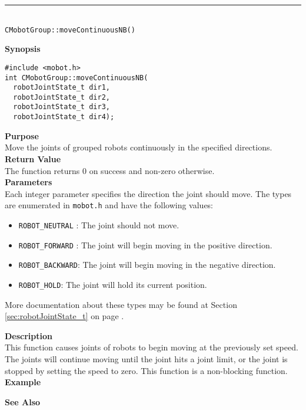 \noindent
\vspace{5pt}
\rule{4.5in}{0.015in}\\
\noindent
{\LARGE \texttt{CMobotGroup::moveContinuousNB()}}\\
{}

\noindent
{\bf Synopsis}
\vspace{-8pt}
\begin{verbatim}
#include <mobot.h>
int CMobotGroup::moveContinuousNB(
  robotJointState_t dir1, 
  robotJointState_t dir2, 
  robotJointState_t dir3, 
  robotJointState_t dir4);
\end{verbatim}

\noindent
{\bf Purpose}\\
Move the joints of grouped robots continuously in the specified directions.\\

\noindent
{\bf Return Value}\\
The function returns 0 on success and non-zero otherwise.\\

\noindent
{\bf Parameters}\\
Each integer parameter specifies the direction the joint should move. The types
are enumerated in \texttt{mobot.h} and have the following values:
\begin{itemize}
\item \texttt{ROBOT\_NEUTRAL} : The joint should not move.
\item \texttt{ROBOT\_FORWARD} : The joint will begin moving in the positive direction.
\item \texttt{ROBOT\_BACKWARD}: The joint will begin moving in the negative direction.
\item \texttt{ROBOT\_HOLD}: The joint will hold its current position.
\end{itemize}
More documentation about these types may be found at Section
\ref{sec:robotJointState_t} on page
\pageref{sec:robotJointState_t}.

\noindent
{\bf Description}\\
This function causes joints of robots to begin moving at the previously set
speed. The joints will continue moving until the joint hits a joint limit, or
the joint is stopped by setting the speed to zero. This function is a non-blocking
function.\\

\noindent
{\bf Example}\\
\noindent

\noindent
{\bf See Also}\\


